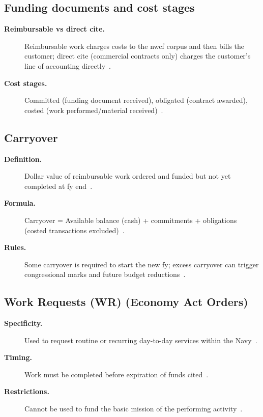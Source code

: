 \documentclass[../main.tex]{subfiles}
\begin{document}
\subsection{Funding documents and cost stages}
\begin{description}
  \item[\textbf{Reimbursable vs direct cite.}] Reimbursable work charges costs to the \ac{nwcf} corpus and then bills the customer; direct cite (commercial contracts only) charges the customer's line of accounting directly~\autocite{edo-3-1-5-field-activity-fm-2025}.
  \item[\textbf{Cost stages.}] Committed (funding document received), obligated (contract awarded), costed (work performed/material received)~\autocite{edo-3-1-5-field-activity-fm-2025}.
\end{description}

\subsection{Carryover}
\begin{description}
  \item[\textbf{Definition.}] Dollar value of reimbursable work ordered and funded but not yet completed at \ac{fy} end~\autocite{edo-3-1-5-field-activity-fm-2025,DoDFMR-Vol11B-Ch3}.
  \item[\textbf{Formula.}] Carryover = Available balance (cash) + commitments + obligations (costed transactions excluded)~\autocite{edo-3-1-5-field-activity-fm-2025}.
  \item[\textbf{Rules.}] Some carryover is required to start the new \ac{fy}; excess carryover can trigger congressional marks and future budget reductions~\autocite{edo-3-1-5-field-activity-fm-2025}.
\end{description}

\subsection{Work Requests (WR) (Economy Act Orders)}
\begin{description}
  \item[\textbf{Specificity.}] Used to request routine or recurring day-to-day services within the Navy~\autocite{edo-3-1-5-field-activity-fm-2025,DoDFMR-Vol11A-Ch3}.
  \item[\textbf{Timing.}] Work must be completed before expiration of funds cited~\autocite{edo-3-1-5-field-activity-fm-2025,DoDFMR-Vol11A-Ch3}.
  \item[\textbf{Restrictions.}] Cannot be used to fund the basic mission of the performing activity~\autocite{edo-3-1-5-field-activity-fm-2025,DoDFMR-Vol11A-Ch3}.
\end{description}
\end{document}
